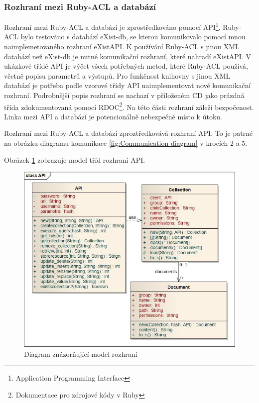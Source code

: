 \subsubsection{Rozhraní mezi Ruby-ACL a databází}
Rozhraní mezi Ruby-ACL a databází je zprostředkováno pomocí API\footnote[1]{Application Programming Interface}.
Ruby-ACL bylo testováno s databází eXist-db, se kterou komunikovalo pomocí mnou naimplemetovaného rozhraní eXistAPI. 
K používání Ruby-ACL s jinou XML databází než eXist-db je nutné komunikační rozhraní, které nahradí eXistAPI.
V ukázkové třídě API je výčet všech potřebných metod, které Ruby-ACL používá, včetně popisu parametrů a výstupů. Pro funkčnost knihovny s jinou XML databází je potřeba podle vzorové třídy API naimplementovat nové komunikační rozhraní. 
Podrobnější popis rozhraní se nachazí v příloženém CD jako prázdná třída zdokumentovaná pomocí RDOC\footnote[2]{Dokumentace pro zdrojové kódy v Ruby}. Na této části rozhraní záleží bezpočenost. Linka mezi API a databází je potencionálně nebezpečné místo k útoku.

\noindent Rozhraní mezi Ruby-ACL a databází zproztředkovává rozhraní API. To je patrné na obrázku diagramu komunikace \ref{fig:Communication diagram} v krocích 2 a 5.

\noindent Obrázek \ref{fig:API_interface} zobrazuje model tříd rozhraní API.

\begin{figure}
\includegraphics[width=15cm]{API1.jpg}
\caption{Diagram znázorňující model rozhraní}
\label{fig:API_interface}
\end{figure}

